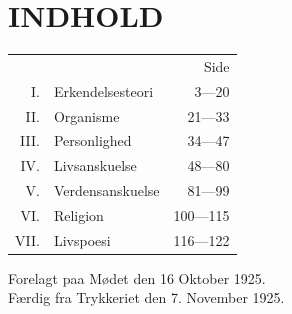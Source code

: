 \documentclass[12pt]{article}
\begin{document}
\section*{INDHOLD}
\begin{center}
\begin{tabular}{@{}r@{\ \ }l@{\qquad}r@{}}
 & & Side\\
I. & Erkendelsesteori & 3---20\\
II. & Organisme & 21---33\\
III. & Personlighed & 34---47\\
IV. & Livsanskuelse & 48---80\\
V. & Verdensanskuelse & 81---99\\
VI. & Religion & 100---115\\
VII. & Livspoesi & 116---122\\
\end{tabular}
\end{center}

\bigskip
\noindent Forelagt paa Mødet den 16 Oktober 1925.\\
Færdig fra Trykkeriet den 7. November 1925.
\end{document}
